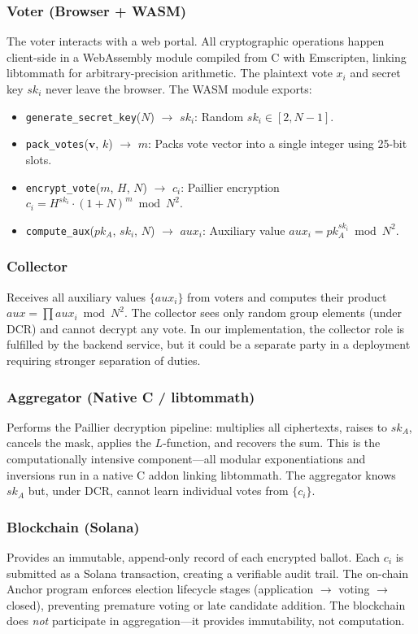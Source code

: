 \documentclass[11pt, a4paper]{article}
\begin{document}
\subsubsection{Voter (Browser + WASM)}
The voter interacts with a web portal. All cryptographic operations happen client-side in a WebAssembly module compiled from C with Emscripten, linking libtommath for arbitrary-precision arithmetic. The plaintext vote $x_i$ and secret key $sk_i$ never leave the browser. The WASM module exports:
\begin{itemize}[leftmargin=*]
    \item \texttt{generate\_secret\_key}($N$) $\to$ $sk_i$: Random $sk_i \in [2, N-1]$.
    \item \texttt{pack\_votes}($\mathbf{v}$, $k$) $\to$ $m$: Packs vote vector into a single integer using 25-bit slots.
    \item \texttt{encrypt\_vote}($m$, $H$, $N$) $\to$ $c_i$: Paillier encryption $c_i = H^{sk_i} \cdot (1+N)^m \bmod N^2$.
    \item \texttt{compute\_aux}($pk_A$, $sk_i$, $N$) $\to$ $aux_i$: Auxiliary value $aux_i = pk_A^{sk_i} \bmod N^2$.
\end{itemize}

\subsubsection{Collector}
Receives all auxiliary values $\{aux_i\}$ from voters and computes their product $aux = \prod aux_i \bmod N^2$. The collector sees only random group elements (under DCR) and cannot decrypt any vote. In our implementation, the collector role is fulfilled by the backend service, but it could be a separate party in a deployment requiring stronger separation of duties.

\subsubsection{Aggregator (Native C / libtommath)}
Performs the Paillier decryption pipeline: multiplies all ciphertexts, raises to $sk_A$, cancels the mask, applies the $L$-function, and recovers the sum. This is the computationally intensive component---all modular exponentiations and inversions run in a native C addon linking libtommath. The aggregator knows $sk_A$ but, under DCR, cannot learn individual votes from $\{c_i\}$.

\subsubsection{Blockchain (Solana)}
Provides an immutable, append-only record of each encrypted ballot. Each $c_i$ is submitted as a Solana transaction, creating a verifiable audit trail. The on-chain Anchor program enforces election lifecycle stages (application $\to$ voting $\to$ closed), preventing premature voting or late candidate addition. The blockchain does \emph{not} participate in aggregation---it provides immutability, not computation.
\end{document}
